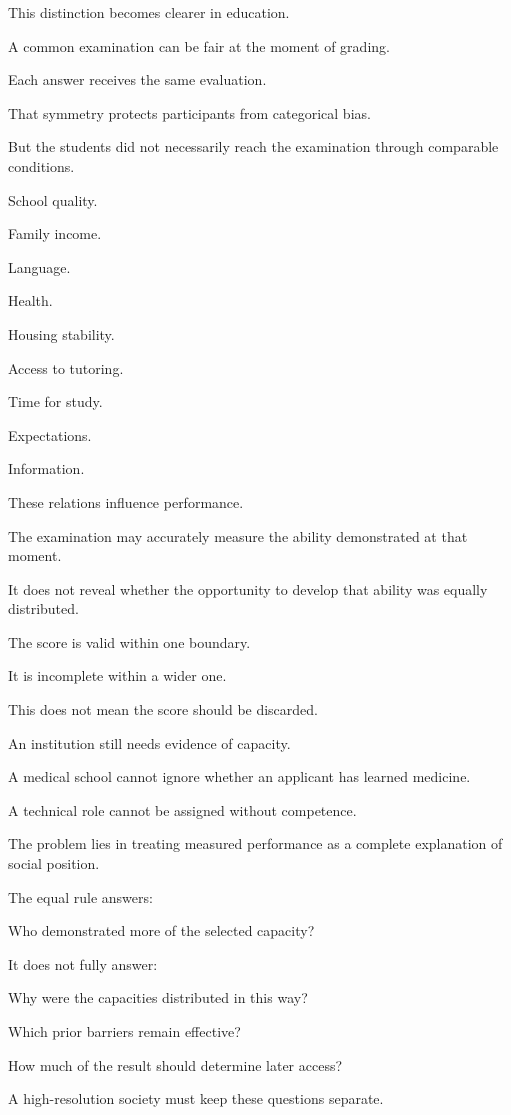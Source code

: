 This distinction becomes clearer in education.

A common examination can be fair at the moment of grading.

Each answer receives the same evaluation.

That symmetry protects participants from categorical bias.

But the students did not necessarily reach the examination through comparable conditions.

School quality.

Family income.

Language.

Health.

Housing stability.

Access to tutoring.

Time for study.

Expectations.

Information.

These relations influence performance.

The examination may accurately measure the ability demonstrated at that moment.

It does not reveal whether the opportunity to develop that ability was equally distributed.

The score is valid within one boundary.

It is incomplete within a wider one.

This does not mean the score should be discarded.

An institution still needs evidence of capacity.

A medical school cannot ignore whether an applicant has learned medicine.

A technical role cannot be assigned without competence.

The problem lies in treating measured performance as a complete explanation of social position.

The equal rule answers:

Who demonstrated more of the selected capacity?

It does not fully answer:

Why were the capacities distributed in this way?

Which prior barriers remain effective?

How much of the result should determine later access?

A high-resolution society must keep these questions separate.

